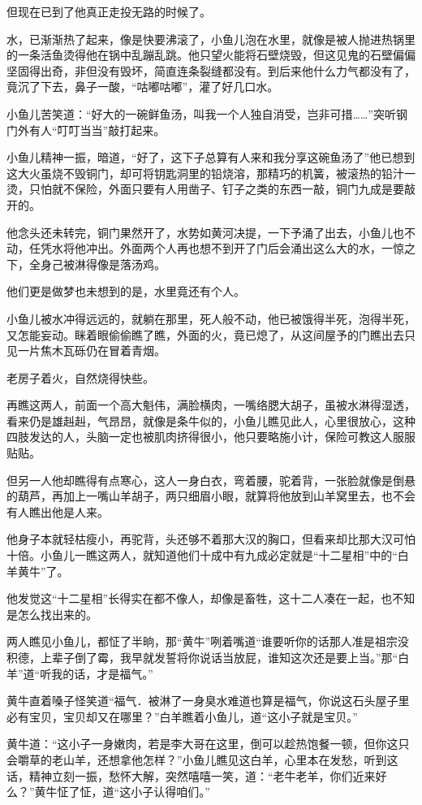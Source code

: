 \documentclass[12pt,oneside]{book}
\begin{document}
但现在已到了他真正走投无路的时候了。

水，已渐渐热了起来，像是快要沸滚了，小鱼儿泡在水里，就像是被人抛进热锅里的一条活鱼烫得他在锅中乱蹦乱跳。他只望火能将石壁烧毁，但这见鬼的石壁偏偏坚固得出奇，非但没有毁坏，简直连条裂缝都没有。到后来他什么力气都没有了，竟沉了下去，鼻子一酸，``咕嘟咕嘟''，灌了好几口水。

小鱼儿苦笑道：``好大的一碗鲜鱼汤，叫我一个人独自消受，岂非可措\ldots\ldots{}''突听钢门外有人``叮叮当当''敲打起来。

小鱼儿精神一振，暗道，``好了，这下子总算有人来和我分享这碗鱼汤了''他已想到这大火虽烧不毁铜门，却可将钥匙洞里的铅烧溶，那精巧的机簧，被滚热的铅汁一烫，只怕就不保险，外面只要有人用凿子、钉子之类的东西一敲，铜门九成是要敲开的。

他念头还未转完，铜门果然开了，水势如黄河决提，一下予涌了出去，小鱼儿也不动，任凭水将他冲出。外面两个人再也想不到开了门后会涌出这么大的水，一惊之下，全身己被淋得像是落汤鸡。

他们更是做梦也未想到的是，水里竟还有个人。

小鱼儿被水冲得远远的，就躺在那里，死人般不动，他已被饿得半死，泡得半死，又怎能妄动。眯着眼偷偷瞧了瞧，外面的火，竟已熄了，从这间屋予的门瞧出去只见一片焦木瓦砾仍在冒着青烟。

老房子着火，自然烧得快些。

再瞧这两人，前面一个高大魁伟，满脸横肉，一嘴络腮大胡子，虽被水淋得湿透，看来仍是雄赳赳，气昂昂，就像是条牛似的，小鱼儿瞧见此人，心里很放心，这种四肢发达的人，头脑一定也被肌肉挤得很小，他只要略施小计，保险可教这人服服贴贴。

但另一人他却瞧得有点寒心，这人一身白衣，弯着腰，驼着背，一张脸就像是倒悬的葫芦，再加上一嘴山羊胡子，两只细眉小眼，就算将他放到山羊窝里去，也不会有人瞧出他是人来。

他身子本就轻枯瘦小，再驼背，头还够不着那大汉的胸口，但看来却比那大汉可怕十倍。小鱼儿一瞧这两人，就知道他们十成中有九成必定就是``十二星相''中的``白羊黄牛''了。

他发觉这``十二星相''长得实在都不像人，却像是畜牲，这十二人凑在一起，也不知是怎么找出来的。

两人瞧见小鱼儿，都怔了半晌，那``黄牛''咧着嘴道``谁要听你的话那人准是祖宗没积德，上辈子倒了霉，我早就发誓将你说话当放屁，谁知这次还是要上当。''那``白羊''道``听我的话，才是福气。''

黄牛直着嗓子怪笑道``福气．被淋了一身臭水难道也算是福气，你说这石头屋子里必有宝贝，宝贝却又在哪里？''白羊瞧着小鱼儿，道``这小子就是宝贝。''

黄牛道：``这小子一身嫩肉，若是李大哥在这里，倒可以趁热饱餐一顿，但你这只会嚼草的老山羊，还想拿他怎样？''小鱼儿瞧见这白羊，心里本在发愁，听到这话，精神立刻一振，愁怀大解，突然嘻嘻一笑，道：``老牛老羊，你们近来好么？''黄牛怔了怔，道``这小子认得咱们。''
\end{document}
